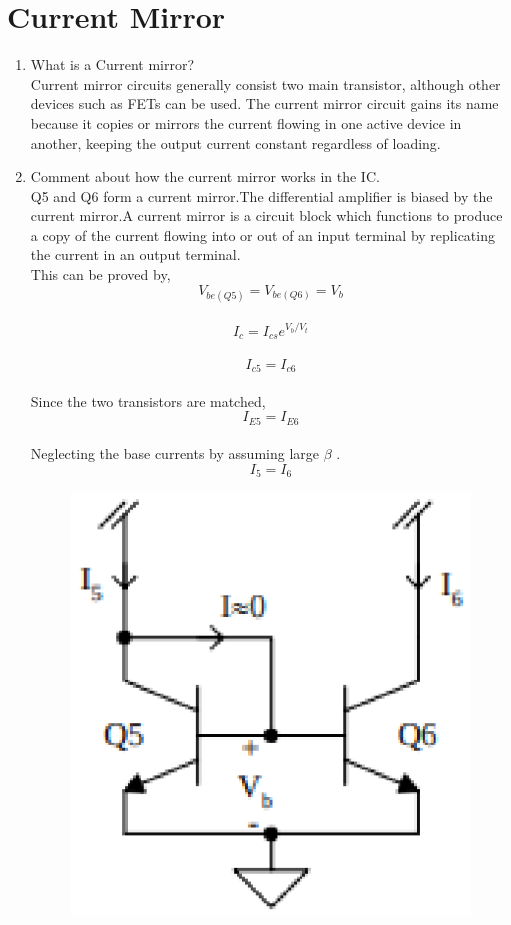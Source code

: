 \documentclass[journal,12pt,twocolumn]{IEEEtran}
\renewcommand\thesection{\arabic{section}}
\begin{document}
\section{Current Mirror}
\begin{enumerate}[label=\thesection.\arabic*,ref=\thesection.\theenumi]
\item What is a Current mirror?\\
\solution Current mirror circuits generally consist two main transistor, although other devices such as FETs can be used. The current mirror circuit gains its name because it copies or mirrors the current flowing in one active device in another, keeping the output current constant regardless of loading.
\item Comment about how the current mirror works in the IC.\\
\solution
Q5 and Q6 form a current mirror.The differential amplifier is biased by the current mirror.A current mirror is a circuit block which functions to produce a copy of the current flowing into or out of an input terminal by replicating the current in an output terminal.\\
This can be proved by,
\bigskip
\vspace{-1em}
$$V_{be(Q5)}=V_{be(Q6)}=V_b$$\\
\vspace{-1em}
$$I_c=I_{cs}e^{V_b/V_t}$$\\
\vspace{-1em}
$$I_{c5}=I_{c6}$$\\
\vspace{-0.5em}
Since the two transistors are matched,\\
\vspace{-1em}
$$I_{E5}=I_{E6}$$\\
\vspace{-0.5em}
Neglecting the base currents by assuming large $\beta$ .\\
\vspace{-1em}
$$I_5=I_6$$


 \begin{figure}[!ht]
\centering
\includegraphics[width=0.7\columnwidth]{./Fig/LM3863.eps}
\caption{}
\label{fig:1}
\end{figure}

\end{enumerate}
\end{document}
